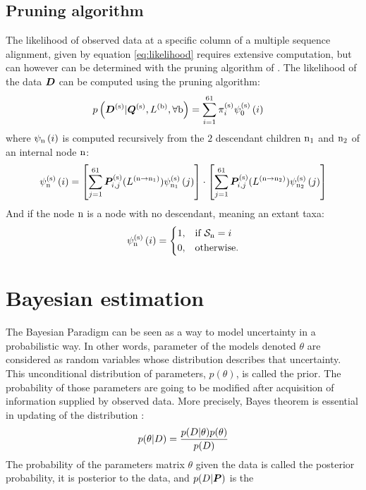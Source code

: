 \subsection{Pruning algorithm}
The likelihood of observed data at a specific column of a multiple sequence alignment, given by equation \ref{eq:likelihood} requires extensive computation, but can however can be determined with the pruning algorithm of \citet{Felsenstein1985}. 
The likelihood of the data $\bm{D}$ can be computed using the pruning algorithm:
\begin{align}
p\left(\bm{D}^{(\text{s})}| \bm{Q}^{(\text{s})}, L^{(\text{b})}, \forall \text{b} \right) & = \sum_{{i}=1}^{61} \pi^{(\text{s})}_{{i}} \psi^{(\text{s})}_{0} \left( {i} \right)
\end{align}
where $\psi_{\text{n}} \left( {i} \right)$ is computed recursively from the $2$ descendant children $\text{n}_{1}$ and $\text{n}_{2}$ of an internal node $\text{n}$:
\begin{align}
\psi^{(\text{s})}_{\text{n}} \left( {i} \right) = 
\left[ \sum_{{j}=1}^{61}\bm{P}^{(\text{s})}_{{i}, {j}}(L^{(\text{n} \to \text{n}_{1})}) \psi^{(\text{s})}_{\text{n}_{1}} \left( {j} \right) \right] 
\cdot 
\left[ \sum_{{j}=1}^{61}\bm{P}^{(\text{s})}_{{i}, {j}}(L^{(\text{n} \to \text{n}_{2})}) \psi^{(\text{s})}_{\text{n}_{2}} \left( {j} \right) \right] 
\end{align}
And if the node $\text{n}$ is a node with no descendant, meaning an extant taxa:
\begin{align}
\psi^{(\text{s})}_{\text{n}} \left( {i} \right) =
\begin{dcases}
1, & \text{if } \mathcal{S}_{\text{n}} = {i} \\
0, & \text{otherwise.}
\end{dcases}
\end{align}

\section{Bayesian estimation}
The Bayesian Paradigm can be seen as a way to model uncertainty in a probabilistic way.
In other words, parameter of the models denoted $\theta$ are considered as random variables whose distribution describes that uncertainty.
This unconditional distribution of parameters, $p(\theta)$, is called the prior.
The probability of those parameters are going to be modified after acquisition of information supplied by observed data.
More precisely, Bayes theorem is essential in updating of the distribution :
\begin{equation}
	p(\theta|D)=\frac{p(D|\theta)p(\theta)}{p(D)}
\end{equation}
The probability of the parameters matrix $\theta$ given the data is called the posterior probability, it is \gls{posterior} to the data, and $p(D|\bm{P})$ is the 


